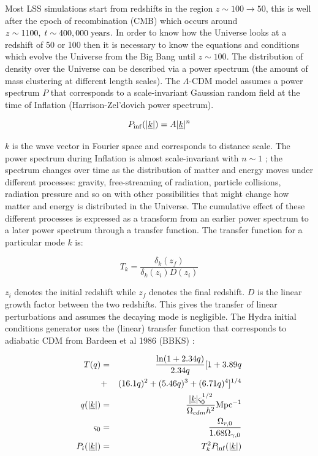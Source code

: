 Most LSS simulations start from redshifts in the region $z \sim 100 \rightarrow 50$, this is well after the epoch of recombination (CMB) which occurs around $z \sim 1100, \; t \sim 400,000 \; {\rm years}$. In order to know how the Universe looks at a redshift of 50 or 100 then it is necessary to know the equations and conditions which evolve the Universe from the Big Bang until $z \sim 100$. The distribution of density over the Universe can be described via a power spectrum (the amount of mass clustering at different length scales). The $\Lambda$-CDM model assumes a power spectrum $P$ that corresponds to a scale-invariant Gaussian random field at the time of Inflation (Harrison-Zel'dovich power spectrum).

\begin{equation}
P_{\rm inf}(|\underline{k}|) = A |\underline{k}|^n
\end{equation}

\noindent $k$ is the wave vector in Fourier space and corresponds to distance scale. The power spectrum during Inflation is almost scale-invariant with $n\sim 1$ \citep{bib_baum}; the spectrum changes over time as the distribution of matter and energy moves under different processes: gravity, free-streaming of radiation, particle collisions, radiation pressure and so on with other possibilities that might change how matter and energy is distributed in the Universe. The cumulative effect of these different processes is expressed as a transform from an earlier power spectrum to a later power spectrum through a transfer function. The transfer function for a particular mode $k$ is:

\begin{equation}
T_k = \frac{\delta_k(z_f)}{\delta_k(z_i) D(z_i)}
\end{equation}

\noindent $z_i$ denotes the initial redshift while $z_f$ denotes the final redshift. $D$ is the linear growth factor between the two redshifts. This gives the transfer of linear perturbations and assumes the decaying mode is negligible. The Hydra initial conditions generator uses the (linear) transfer function that corresponds to adiabatic CDM from Bardeen et al 1986 (BBKS) \citep{bib_bar}:

\begin{eqnarray}
T(q) &=& \frac{\ln(1+2.34q)}{2.34q}[1+ 3.89q \nonumber \\
	&+& (16.1q)^2 + (5.46q)^3 + (6.71q)^4]^{1/4} \\
q(|\underline{k}|) &=& \frac{|\underline{k}| \varsigma^{1/2}_0 }{\Omega_{cdm} h^2} \rm{Mpc^{-1}} \\
\varsigma_0 &=& \frac{\Omega_{r,0}}{1.68\Omega_{\gamma,0}} \\
P_i(|\underline{k}|) &=& T_k^2 P_{\rm inf}(|\underline{k}|)
\end{eqnarray}

